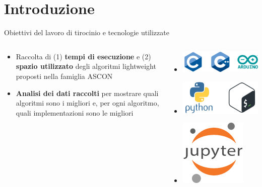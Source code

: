 \section{Introduzione}


\begin{frame}{Obiettivi del lavoro di tirocinio e tecnologie utilizzate}

\begin{columns}

\begin{column}{0.5\textwidth}

\begin{itemize}[<+->]
    \item Raccolta di (1) \textbf{tempi di esecuzione} e (2) \textbf{spazio utilizzato} degli algoritmi lightweight proposti nella famiglia ASCON
    \item \textbf{Analisi dei dati raccolti} per mostrare quali algoritmi sono i migliori e, per ogni algoritmo, quali implementazioni sono le migliori
\end{itemize}

\end{column}

\begin{column}{0.5\textwidth}
    
\begin{itemize}[<+->]
    \item[] \includegraphics[height=0.15\textwidth]{images/board.png} \vspace{0.5cm}
    \item[] \includegraphics[height=0.15\textwidth]{images/automation.png} \vspace{0.5cm}
    \item[] \includegraphics[height=0.15\textwidth]{images/plot.png}
\end{itemize}

\end{column}

\end{columns}

\end{frame}

